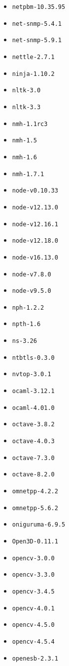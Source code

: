 \begin{itemize}
\item \verb|netpbm-10.35.95|
\item \verb|net-snmp-5.4.1|
\item \verb|net-snmp-5.9.1|
\item \verb|nettle-2.7.1|
\item \verb|ninja-1.10.2|
\item \verb|nltk-3.0|
\item \verb|nltk-3.3|
\item \verb|nmh-1.1rc3|
\item \verb|nmh-1.5|
\item \verb|nmh-1.6|
\item \verb|nmh-1.7.1|
\item \verb|node-v0.10.33|
\item \verb|node-v12.13.0|
\item \verb|node-v12.16.1|
\item \verb|node-v12.18.0|
\item \verb|node-v16.13.0|
\item \verb|node-v7.8.0|
\item \verb|node-v9.5.0|
\item \verb|nph-1.2.2|
\item \verb|npth-1.6|
\item \verb|ns-3.26|
\item \verb|ntbtls-0.3.0|
\item \verb|nvtop-3.0.1|
\item \verb|ocaml-3.12.1|
\item \verb|ocaml-4.01.0|
\item \verb|octave-3.8.2|
\item \verb|octave-4.0.3|
\item \verb|octave-7.3.0|
\item \verb|octave-8.2.0|
\item \verb|omnetpp-4.2.2|
\item \verb|omnetpp-5.6.2|
\item \verb|oniguruma-6.9.5|
\item \verb|Open3D-0.11.1|
\item \verb|opencv-3.0.0|
\item \verb|opencv-3.3.0|
\item \verb|opencv-3.4.5|
\item \verb|opencv-4.0.1|
\item \verb|opencv-4.5.0|
\item \verb|opencv-4.5.4|
\item \verb|openesb-2.3.1|

\end{itemize}
